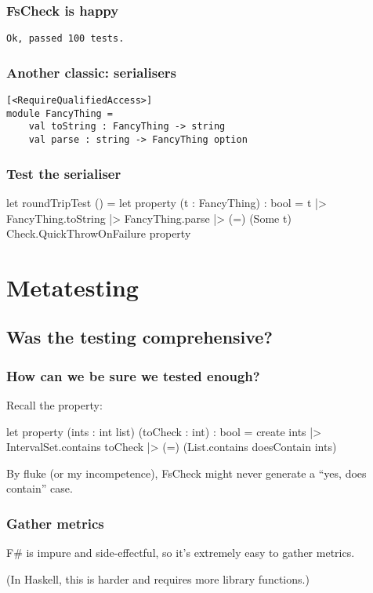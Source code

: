 \documentclass{beamer}
\begin{document}
\begin{frame}[fragile]
\frametitle{FsCheck is happy}
\begin{verbatim}
Ok, passed 100 tests.
\end{verbatim}
\end{frame}

\begin{frame}[fragile]
\frametitle{Another classic: serialisers}

\begin{verbatim}
[<RequireQualifiedAccess>]
module FancyThing =
    val toString : FancyThing -> string
    val parse : string -> FancyThing option
\end{verbatim}
\end{frame}

\begin{frame}[fragile]
\frametitle{Test the serialiser}

\begin{fslisting}
[<Test>]
let roundTripTest () =
    let property (t : FancyThing) : bool =
        t
        |> FancyThing.toString
        |> FancyThing.parse
        |> (=) (Some t)
    Check.QuickThrowOnFailure property
\end{fslisting}
\end{frame}

\section{Metatesting}
\tableofcontents

\subsection{Was the testing comprehensive?}

\begin{frame}[fragile]
\frametitle{How can we be sure we tested enough?}

Recall the property:
\begin{fslisting}
let property (ints : int list) (toCheck : int) : bool =
    create ints
    |> IntervalSet.contains toCheck
    |> (=) (List.contains doesContain ints)

\end{fslisting}

By fluke (or my incompetence), FsCheck might never generate a ``yes, does contain'' case.
\end{frame}

\begin{frame}
\frametitle{Gather metrics}
F\# is impure and side-effectful, so it's extremely easy to gather metrics.

(In Haskell, this is harder and requires more library functions.)
\end{frame}
\end{document}
